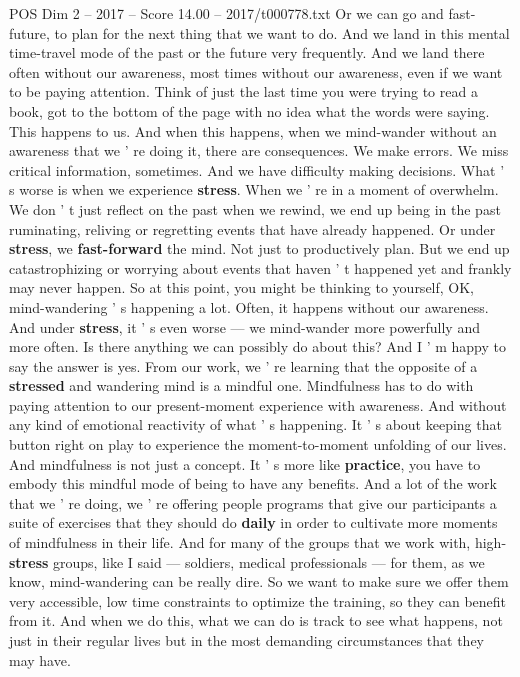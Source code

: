 \begin{textsample}{POS Dim 2 – 2017 – Score 14.00 – 2017/t000778.txt}
Or we can go and fast- future, to plan for the next thing that we want to do.
And we land in this mental time-travel mode of the past or the future very frequently.
And we land there often without our awareness, most times without our awareness, even if we want to be paying attention.
Think of just the last time you were trying to read a book, got to the bottom of the page with no idea what the words were saying.
This happens to us.
And when this happens, when we mind-wander without an awareness that we ' re doing it, there are consequences.
We make errors.
We miss critical information, sometimes.
And we have difficulty making decisions.
What ' s worse is when we experience \textbf{stress}.
When we ' re in a moment of overwhelm.
We don ' t just reflect on the past when we rewind, we end up being in the past ruminating, reliving or regretting events that have already happened.
Or under \textbf{stress}, we \textbf{fast-forward} the mind.
Not just to productively plan.
But we end up catastrophizing or worrying about events that haven ' t happened yet and frankly may never happen.
So at this point, you might be thinking to yourself, OK, mind-wandering ' s happening a lot.
Often, it happens without our awareness.
And under \textbf{stress}, it ' s even worse — we mind-wander more powerfully and more often.
Is there anything we can possibly do about this?
And I ' m happy to say the answer is yes.
From our work, we ' re learning that the opposite of a \textbf{stressed} and wandering mind is a mindful one.
Mindfulness has to do with paying attention to our present-moment experience with awareness.
And without any kind of emotional reactivity of what ' s happening.
It ' s about keeping that button right on play to experience the moment-to-moment unfolding of our lives.
And mindfulness is not just a concept.
It ' s more like \textbf{practice}, you have to embody this mindful mode of being to have any benefits.
And a lot of the work that we ' re doing, we ' re offering people programs that give our participants a suite of exercises that they should do \textbf{daily} in order to cultivate more moments of mindfulness in their life.
And for many of the groups that we work with, high- \textbf{stress} groups, like I said — soldiers, medical professionals — for them, as we know, mind-wandering can be really dire.
So we want to make sure we offer them very accessible, low time constraints to optimize the training, so they can benefit from it.
And when we do this, what we can do is track to see what happens, not just in their regular lives but in the most demanding circumstances that they may have.

\end{textsample}
